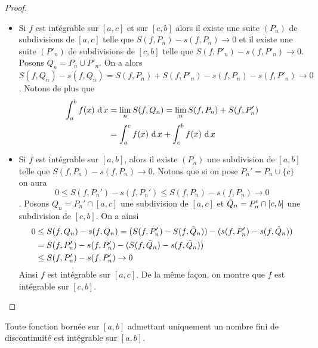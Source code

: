 \begin{proof}
    \begin{itemize}
        \item Si $f$ est intégrable sur $[a,c]$ et sur $[c,b]$ alors il existe une suite $(P_n)$ de subdivisions de $[a,c]$ telle que $S(f,P_n)-s(f,P_n)\to 0$ et il existe une suite $(P'_n)$ de subdivisions de $[c,b]$ telle que $S(f,P'_n)-s(f,P'_n)\to 0$. Posons $Q_n = P_n\cup P'_n$. On a alors $S(f,Q_n)-s(f,Q_n) = S(f,P_n)+ S(f,P'_n) - s(f,P_n)-s(f,P'_n)\to 0$.
        Notons de plus que \begin{align*}
            \int_a^bf(x)\,\operatorname{d} x &= \lim_n S(f,Q_n) = \lim_n S(f,P_n) + S(f,P_n') \\
            &= \int_a^cf(x)\,\operatorname{d} x + \int_c^bf(x)\,\operatorname{d} x
        \end{align*}
        \item Si $f$ est intégrable sur $[a,b]$, alors il existe $(P_n)$ une subdivision de $[a,b]$ telle que $S(f,P_n) - s(f,P_n)\to 0$. Notons que si on pose $P_n' = P_n\cup\{c\}$ on aura $$0\le S(f,P_n')-s(f,P_n')\le S(f,P_n)-s(f,P_n)\to 0$$. Posons $Q_n = P_n'\cap[a,c]$ une subdivision de $[a,c]$ et $\Tilde{Q}_n = P'_n\cap [c,b]$ une subdivision de $[c,b]$.
        On a ainsi \begin{align*}
            0&\le S(f,Q_n)-s(f,Q_n) = (S(f,P_n')-S(f,\Tilde{Q}_n))- (s(f,P_n')-s(f,\Tilde{Q}_n))\\
            &= S(f,P_n')-s(f,P_n') -( S(f,\Tilde Q _n) - s(f,\Tilde Q_n))\\
            &\le S(f,P_n')-s(f,P_n')\to 0
        \end{align*}
        Ainsi $f$ est intégrable sur $[a,c]$. De la même façon, on montre que $f$ est intégrable sur $[c,b]$.
    \end{itemize}
\end{proof}
\begin{proposition}
    Toute fonction bornée sur $[a,b]$ admettant uniquement un nombre fini de discontinuité est intégrable sur $[a,b]$.
\end{proposition}
